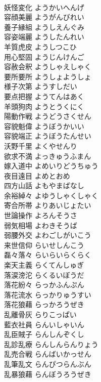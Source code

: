\documentclass[8pt]{extreport}
\begin{document}
\begin{CJK}{UTF8}{min}
\\	妖怪変化	ようかいへんげ	
\\	容顔美麗	ようがんびれい	
\\	養子縁組	ようしえんぐみ	
\\	容姿端麗	ようしたんれい	
\\	羊質虎皮	ようしつこひ	
\\	用心堅固	ようじんけんご	
\\	容赦会釈	ようしゃえしゃく	
\\	要所要所	ようしょようしょ	
\\	様子次第	ようすしだい	
\\	要点把握	ようてんはあく	
\\	羊頭狗肉	ようとうくにく	
\\	陽動作戦	ようどうさくせん	
\\	容貌魁偉	ようぼうかいい	
\\	容貌端正	ようぼうたんせい	
\\	沃野千里	よくやせんり	
\\	欲求不満	よっきゅうふまん	
\\	嫁入道中	よめいりどうちゅう	
\\	夜目遠目	よめとおめ	
\\	四方山話	よもやまばなし	
\\	余裕綽々	よゆうしゃくしゃく	
\\	寄合所帯	よりあいじょたい	
\\	世論操作	よろんそうさ	
\\	弱気相場	よわきそうば	
\\	弱腰外交	よわごしがいこう	
\\	来世信仰	らいせしんこう	
\\	磊々落々	らいらいらくらく	
\\	楽天主義	らくてんしゅぎ	
\\	落涙滂沱	らくるいぼうだ	
\\	落花紛々	らっかふんぷん	
\\	落花流水	らっかりゅうすい	
\\	落花狼藉	らっかろうぜき	
\\	乱離骨灰	らりこっぱい	
\\	藍衣社員	らんいしゃいん	
\\	乱臣賊子	らんしんぞくし	
\\	乱診乱療	らんしんらんりょう	
\\	乱売合戦	らんばいかっせん	
\\	乱筆乱文	らんぴつらんぶん	
\\	乱暴狼藉	らんぼうろうぜき	

\end{CJK}
\end{document}
